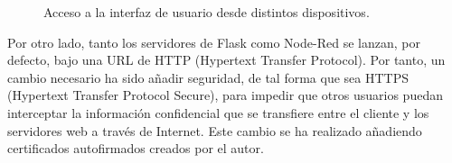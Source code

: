 \begin{figure}[h!]
  \begin{center}
    \hspace{2mm}
  \end{center}
\caption{Acceso a la interfaz de usuario desde distintos dispositivos.} \label{fig:userlogin}
\end{figure}


Por otro lado, tanto los servidores de Flask como Node-Red se lanzan, por defecto, bajo una URL de HTTP (Hypertext Transfer Protocol). Por tanto, un cambio necesario ha sido añadir seguridad, de tal forma que sea HTTPS (Hypertext Transfer Protocol Secure), para impedir que otros usuarios puedan interceptar la información confidencial que se transfiere entre el cliente y los servidores web a través de Internet. Este cambio se ha realizado añadiendo certificados autofirmados creados por el autor.\\

